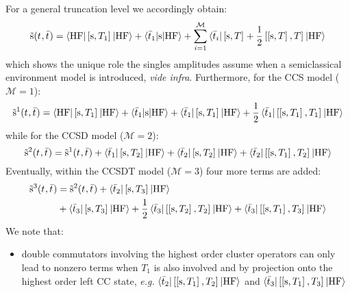 For a general truncation level we accordingly obtain:
\begin{equation}\label{eq:source-term}
  \tilde{\mathrm{s}}(t_{}, \bar{t}_{}) =
  \braket{\mathrm{HF} | \left[ \mathrm{s}, T_1 \right]^{} | \mathrm{HF}}
  + \braket{\bar{t}_{1} | \mathrm{s} | \mathrm{HF}}
  + \sum_{i=1}^{\mathcal{M}}\braket{\bar{t}_{i} | \left[ \mathrm{s}, T \right]^{} + \frac{1}{2}\left[ \left[ \mathrm{s}, T \right]^{}, T \right]^{} | \mathrm{HF}}
\end{equation}
which shows the unique role the singles amplitudes assume when a
semiclassical environment model is introduced, \emph{vide infra}.
Furthermore, for the \acs{CCS} model ($\mathcal{M} = 1$):
\begin{equation}
  \tilde{\mathrm{s}}^1(t_{}, \bar{t}_{}) =
  \braket{\mathrm{HF} | \left[ \mathrm{s}, T_1 \right]^{} | \mathrm{HF}}
  + \braket{\bar{t}_{1} | \mathrm{s} | \mathrm{HF}}
  + \braket{\bar{t}_{1} | \left[ \mathrm{s}, T_1 \right]^{} | \mathrm{HF}}
  + \frac{1}{2}\braket{\bar{t}_{1} | \left[ \left[ \mathrm{s}, T_1 \right]^{}, T_1 \right]^{} | \mathrm{HF}}
\end{equation}
while for the \acs{CCSD} model ($\mathcal{M} = 2$):
\begin{equation}
  \tilde{\mathrm{s}}^2(t_{}, \bar{t}_{}) =
  \tilde{\mathrm{s}}^1(t_{}, \bar{t}_{})
  + \braket{\bar{t}_{1} | \left[ \mathrm{s}, T_2 \right]^{} | \mathrm{HF}}
  + \braket{\bar{t}_{2} | \left[ \mathrm{s}, T_2 \right]^{} | \mathrm{HF}}
  + \braket{\bar{t}_{2} | \left[ \left[ \mathrm{s}, T_1 \right]^{}, T_2 \right]^{} | \mathrm{HF}}
\end{equation}
Eventually, within the \acs{CCSDT} model ($\mathcal{M} = 3$) four more
terms are added:
\begin{equation}
  \begin{aligned}
  \tilde{\mathrm{s}}^3(t_{}, \bar{t}_{}) &=
  \tilde{\mathrm{s}}^2(t_{}, \bar{t}_{})
  + \braket{\bar{t}_{2} | \left[ \mathrm{s}, T_3 \right]^{} | \mathrm{HF}} \\
  &+ \braket{\bar{t}_{3} | \left[ \mathrm{s}, T_3 \right]^{} | \mathrm{HF}}
  + \frac{1}{2}
  \braket{\bar{t}_{3} | \left[ \left[ \mathrm{s}, T_2 \right]^{}, T_2 \right]^{} |
  \mathrm{HF}}
  + \braket{\bar{t}_{3} | \left[ \left[ \mathrm{s}, T_1 \right]^{}, T_3 \right]^{} |
  \mathrm{HF}}
  \end{aligned}
\end{equation}
We note that:
\begin{itemize}
    \item double commutators involving the highest order cluster
      operators can only lead to nonzero terms when $T_1$ is also
      involved and by projection onto the highest order left \acs{CC}
      state, \emph{e.g.}
      $\braket{\bar{t}_{2} | \left[ \left[ \mathrm{s}, T_1 \right]^{}, T_2 \right]^{} | \mathrm{HF}}$
      and
      $\braket{\bar{t}_{3} | \left[ \left[ \mathrm{s}, T_1 \right]^{}, T_3 \right]^{} | \mathrm{HF}}$
\end{itemize}

